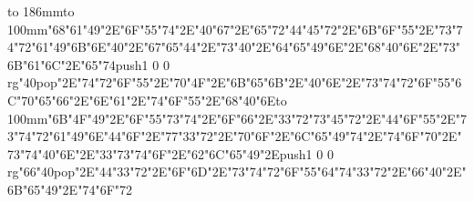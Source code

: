 \hbox to 186mm{\hsize=81mm\vbox to 100mm{\vfill\ipa\char"68\ipa\char"61\ipa\char"49\ipa\char"2E\ipa\char"6F\ipa\char"55\ipa\char"74\ipa\char"2E\ipa\char"40\ipa\char"67\ipa\char"2E\ipa\char"65\ipa\char"72\medskip\ipa\char"44\ipa\char"45\ipa\char"72\ipa\char"2E\ipa\char"6B\ipa\char"6F\ipa\char"55\ipa\char"2E\ipa\char"73\ipa\char"74\ipa\char"72\ipa\char"61\ipa\char"49\ipa\char"6B\medskip\ipa\char"6E\ipa\char"40\ipa\char"2E\ipa\char"67\ipa\char"65\ipa\char"44\ipa\char"2E\ipa\char"73\ipa\char"40\ipa\char"2E\ipa\char"64\ipa\char"65\ipa\char"49\ipa\char"6E\ipa\char"2E\ipa\char"68\ipa\char"40\ipa\char"6E\ipa\char"2E\ipa\char"73\ipa\char"6B\ipa\char"61\ipa\char"6C\ipa\char"2E\ipa\char"65\ipa\char"74\medskip\pdfcolorstack\match push{1 0 0 rg}\ipa\char"40\pdfcolorstack\match pop{}\ipa\char"2E\ipa\char"74\ipa\char"72\ipa\char"6F\ipa\char"55\ipa\char"2E\ipa\char"70\ipa\char"4F\ipa\char"2E\ipa\char"6B\ipa\char"65\ipa\char"6B\ipa\char"2E\ipa\char"40\ipa\char"6E\ipa\char"2E\ipa\char"73\ipa\char"74\ipa\char"72\ipa\char"6F\ipa\char"55\ipa\char"6C\medskip\ipa\char"70\ipa\char"65\ipa\char"66\ipa\char"2E\ipa\char"6E\ipa\char"61\ipa\char"2E\ipa\char"74\ipa\char"6F\ipa\char"55\ipa\char"2E\ipa\char"68\ipa\char"40\ipa\char"6E\vfill}\hfill\vbox to 100mm{\vfill\ipa\char"6B\ipa\char"4F\ipa\char"49\ipa\char"2E\ipa\char"6F\ipa\char"55\ipa\char"73\ipa\char"74\ipa\char"2E\ipa\char"6F\ipa\char"66\ipa\char"2E\ipa\char"33\ipa\char"72\medskip\ipa\char"73\ipa\char"45\ipa\char"72\ipa\char"2E\ipa\char"44\ipa\char"6F\ipa\char"55\ipa\char"2E\ipa\char"73\ipa\char"74\ipa\char"72\ipa\char"61\ipa\char"49\ipa\char"6E\medskip\ipa\char"44\ipa\char"6F\ipa\char"2E\ipa\char"77\ipa\char"33\ipa\char"72\ipa\char"2E\ipa\char"70\ipa\char"6F\ipa\char"2E\ipa\char"6C\ipa\char"65\ipa\char"49\ipa\char"74\ipa\char"2E\ipa\char"74\ipa\char"6F\ipa\char"70\ipa\char"2E\ipa\char"73\ipa\char"74\ipa\char"40\ipa\char"6E\ipa\char"2E\ipa\char"33\ipa\char"73\ipa\char"74\medskip\ipa\char"6F\ipa\char"2E\ipa\char"62\ipa\char"6C\ipa\char"65\ipa\char"49\ipa\char"2E\pdfcolorstack\match push{1 0 0 rg}\ipa\char"66\ipa\char"40\pdfcolorstack\match pop{}\ipa\char"2E\ipa\char"44\ipa\char"33\ipa\char"72\ipa\char"2E\ipa\char"6F\ipa\char"6D\ipa\char"2E\ipa\char"73\ipa\char"74\ipa\char"72\ipa\char"6F\ipa\char"55\ipa\char"64\medskip\ipa\char"74\ipa\char"33\ipa\char"72\ipa\char"2E\ipa\char"66\ipa\char"40\ipa\char"2E\ipa\char"6B\ipa\char"65\ipa\char"49\ipa\char"2E\ipa\char"74\ipa\char"6F\ipa\char"72\vfill}}\eject
